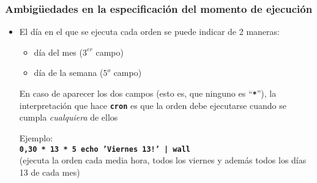 \documentclass[ucs]{beamer}
\begin{document}
%
%

\begin{frame}[fragile]

  \frametitle{Ambigüedades en la especificación del momento de ejecución}

  \begin{itemize}
  \item El día en el que se ejecuta cada orden se puede indicar de 2
    maneras:
    \begin{itemize}
    \item día del mes ($3^{er}$ campo)
    \item día de la semana ($5^o$ campo)
    \end{itemize}

    En caso de aparecer los dos campos (esto es, que ninguno es
    ``\texttt{\textbf{*}}''), la interpretación que hace
    \texttt{\textbf{cron}} es que la orden debe ejecutarse cuando se
    cumpla \emph{cualquiera} de ellos

    Ejemplo: \\
    \texttt{\textbf{0,30 * 13 * 5 echo 'Viernes 13!' | wall}} \\
    (ejecuta la orden cada media hora, todos los viernes y
    además todos los días 13 de cada mes)
  \end{itemize}
\end{frame}
\end{document}
